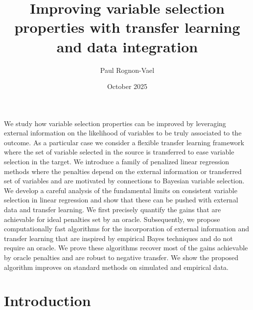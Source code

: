 \documentclass{article}
\title{Improving variable selection properties with transfer learning and data integration}
\author{Paul Rognon-Vael}
\date{October 2025}
\begin{document}
\maketitle
We study how variable selection properties can be improved by leveraging external information 
on the likelihood of variables to be truly associated to the outcome. As a particular case we consider 
a flexible transfer learning framework where the set of variable selected in the source is transferred to 
ease variable selection in the target. We introduce a family of penalized linear regression methods where 
the penalties depend on the external information or transferred set of variables and are motivated by 
connections to Bayesian variable selection. We develop a careful analysis of the fundamental limits on 
consistent variable selection in linear regression and show that these can be pushed with external data 
and transfer learning. We first precisely quantify the gains that are achievable for ideal penalties set by an oracle. 
Subsequently, we propose computationally fast algorithms for the incorporation of external information and transfer 
learning that are inspired by empirical Bayes techniques and do not require an oracle. We prove these algorithms 
recover most of the gains achievable by oracle penalties and are robust to negative transfer. We show the proposed algorithm improves on standard methods
on simulated and empirical data.

\paul{}

\section{Introduction}
\end{document}
